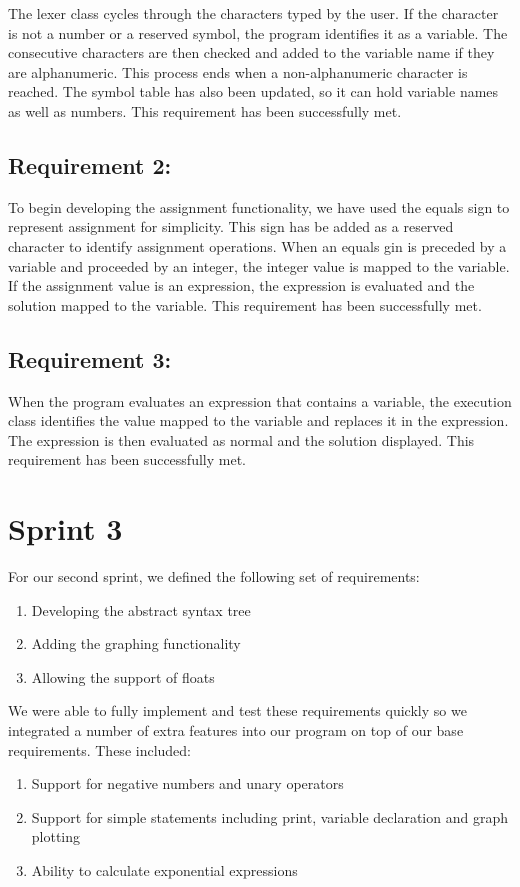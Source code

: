 \documentclass[a4paper, oneside, 11pt]{report}
\begin{document}
The lexer class cycles through the characters typed by the user. If the character is not a number or a reserved symbol, the program identifies it as a variable. The consecutive characters are then checked and added to the variable name if they are alphanumeric. This process ends when a non-alphanumeric character is reached.
The symbol table has also been updated, so it can hold variable names as well as numbers.
This requirement has been successfully met.

\subsection{Requirement 2:}

To begin developing the assignment functionality, we have used the equals sign to represent assignment for simplicity. This sign has be added as a reserved character to identify assignment operations. When an equals gin is preceded by a variable and proceeded by an integer, the integer value is mapped to the variable. If the assignment value is an expression, the expression is evaluated and the solution mapped to the variable.
This requirement has been successfully met.

\subsection{Requirement 3:}

When the program evaluates an expression that contains a variable, the execution class identifies the value mapped to the variable and replaces it in the expression. The expression is then evaluated as normal and the solution displayed.
This requirement has been successfully met.

\section{Sprint 3}

For our second sprint, we defined the following set of requirements:

\begin{enumerate}
\item Developing the abstract syntax tree
\item Adding the graphing functionality
\item Allowing the support of floats
\end{enumerate}

We were able to fully implement and test these requirements quickly so we integrated
a number of extra features into our program on top of our base requirements. These
included:
\begin{enumerate}
\item Support for negative numbers and unary operators
\item Support for simple statements including print, variable declaration and graph plotting
\item  Ability to calculate exponential expressions
\end{enumerate}
\end{document}
